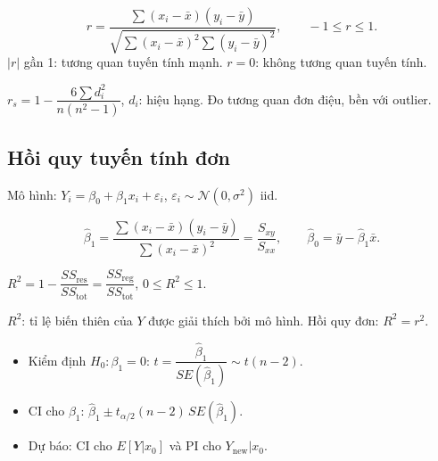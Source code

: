 \documentclass[12pt,a4paper]{article}
\begin{document}
\begin{dinhnghia}[title={Hệ số tương quan Pearson}]
  \[
    r = \frac{\sum(x_i - \bar{x})(y_i - \bar{y})}{\sqrt{\sum(x_i-\bar{x})^2\sum(y_i-\bar{y})^2}}, \qquad -1 \le r \le 1.
  \]
  $|r|$ gần 1: tương quan tuyến tính mạnh. $r = 0$: không tương quan tuyến tính.
\end{dinhnghia}

\begin{dinhnghia}[title={Tương quan hạng (Spearman)}]
  $r_s = 1 - \dfrac{6\sum d_i^2}{n(n^2-1)}$, $d_i$: hiệu hạng. Đo tương quan đơn điệu, bền với outlier.
\end{dinhnghia}

\subsection{Hồi quy tuyến tính đơn}

\begin{dinhnghia}
  Mô hình: $Y_i = \beta_0 + \beta_1 x_i + \varepsilon_i$, $\varepsilon_i \sim \mathcal{N}(0, \sigma^2)$ iid.
\end{dinhnghia}

\begin{congthuc}[title={Ước lượng OLS (bình phương nhỏ nhất)}]
  \[
    \hat{\beta}_1 = \frac{\sum(x_i-\bar{x})(y_i-\bar{y})}{\sum(x_i-\bar{x})^2} = \frac{S_{xy}}{S_{xx}}, \qquad \hat{\beta}_0 = \bar{y} - \hat{\beta}_1\bar{x}.
  \]
\end{congthuc}

\begin{dinhnghia}[title={Hệ số xác định}]
  $R^2 = 1 - \dfrac{SS_{\text{res}}}{SS_{\text{tot}}} = \dfrac{SS_{\text{reg}}}{SS_{\text{tot}}}$, $0 \le R^2 \le 1$.

  $R^2$: tỉ lệ biến thiên của $Y$ được giải thích bởi mô hình. Hồi quy đơn: $R^2 = r^2$.
\end{dinhnghia}

\begin{phuongphap}[title={Kiểm định trong hồi quy}]
  \begin{itemize}
    \item Kiểm định $H_0: \beta_1 = 0$: $t = \dfrac{\hat{\beta}_1}{SE(\hat{\beta}_1)} \sim t(n-2)$.
    \item CI cho $\beta_1$: $\hat{\beta}_1 \pm t_{\alpha/2}(n-2)\,SE(\hat{\beta}_1)$.
    \item Dự báo: CI cho $E[Y|x_0]$ và PI cho $Y_{\text{new}}|x_0$.
  \end{itemize}
\end{phuongphap}
\end{document}
